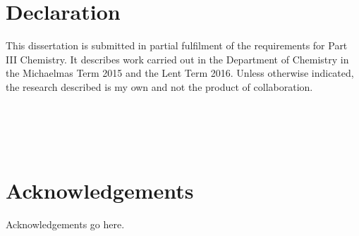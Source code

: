 \documentclass[a4paper,12pt,openright,oneside]{article}
\begin{document}
\cleardoublepage

\cleardoublepage
{}
\thispagestyle{empty}
\cleardoublepage
\section*{Declaration}

This dissertation is submitted in partial fulfilment of the requirements for Part III Chemistry. It describes work carried out in the Department of Chemistry in the Michaelmas Term 2015 and the Lent Term 2016. Unless otherwise indicated, the research described is my own and not the product of collaboration.
\\
\\
\\
\\
\\
\section*{Acknowledgements}

Acknowledgements go here.

\newpage

\cleardoublepage

\newpage

\tableofcontents


\newpage
\cleardoublepage
{}
\fancyhead{}
\rhead{\thepage}
\lhead{\leftmark}
\lfoot[]{}
\rfoot[]{}
\cfoot[]{}
\pagestyle{fancy}
    
\newpage

\newpage

\newpage

\newpage

\newpage




\newpage
{}

\newpage
\cleardoublepage
\end{document}
